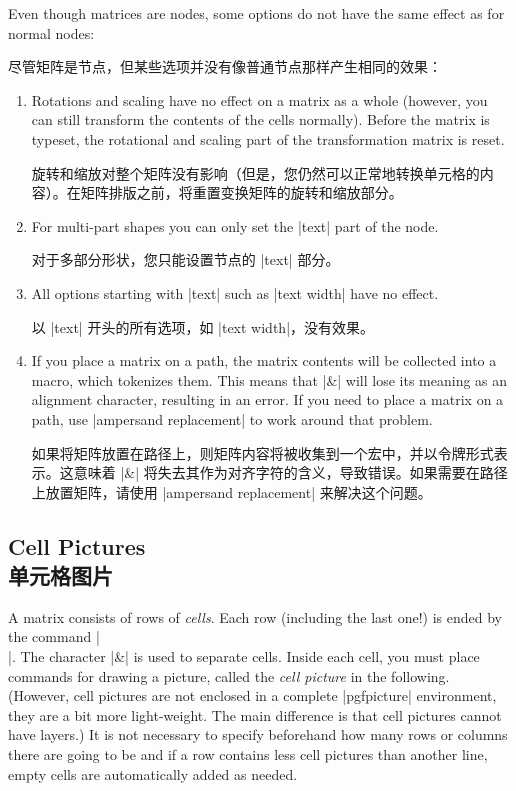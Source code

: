 Even though matrices are nodes, some options do not have the same effect as for
normal nodes:

尽管矩阵是节点，但某些选项并没有像普通节点那样产生相同的效果：

%
\begin{enumerate}
    \item Rotations and scaling have no effect on a matrix as a whole (however,
        you can still transform the contents of the cells normally). Before the
        matrix is typeset, the rotational and scaling part of the
        transformation matrix is reset.

        旋转和缩放对整个矩阵没有影响（但是，您仍然可以正常地转换单元格的内容）。在矩阵排版之前，将重置变换矩阵的旋转和缩放部分。


    \item For multi-part shapes you can only set the |text| part of the node.

    对于多部分形状，您只能设置节点的 |text| 部分。


    \item All options starting with |text| such as |text width| have no effect.

    以 |text| 开头的所有选项，如 |text width|，没有效果。


    \item If you place a matrix on a path, the matrix contents will be
        collected into a macro, which tokenizes them.  This means that |&| will
        lose its meaning as an alignment character, resulting in an error.  If
        you need to place a matrix on a path, use |ampersand replacement| to
        work around that problem.

        如果将矩阵放置在路径上，则矩阵内容将被收集到一个宏中，并以令牌形式表示。这意味着 |&| 将失去其作为对齐字符的含义，导致错误。如果需要在路径上放置矩阵，请使用 |ampersand replacement| 来解决这个问题。


\end{enumerate}


\subsection{Cell Pictures\\单元格图片}
\label{section-tikz-cell-pictures}

A matrix consists of rows of \emph{cells}. Each row (including the last one!)
is ended by the command |\\|. The character |&| is used to separate cells.
Inside each cell, you must place commands for drawing a picture, called the
\emph{cell picture} in the following. (However, cell pictures are not enclosed
in a complete |{pgfpicture}| environment, they are a bit more light-weight. The
main difference is that cell pictures cannot have layers.) It is not necessary
to specify beforehand how many rows or columns there are going to be and if a
row contains less cell pictures than another line, empty cells are
automatically added as needed.

